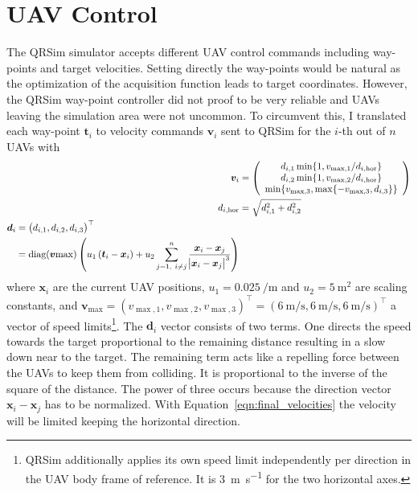 \documentclass[11pt,a4paper,twoside,BCOR=15mm]{scrreprt}
\newcommand{\vc}[1]{\bm{#1}}
\newcommand{\Tr}{^{\top}}
\DeclareMathOperator{\diag}{diag}
\begin{document}
\section{UAV Control}
The QRSim simulator accepts different UAV control commands including way-points 
and target velocities. Setting directly the way-points would be natural as the 
optimization of the acquisition function leads to target coordinates. However, 
the QRSim way-point controller did not proof to be very reliable and UAVs 
leaving the simulation area were not uncommon. To circumvent this, I translated 
each way-point $\vc t_i$ to velocity commands $\vc v_i$ sent to QRSim for the 
$i$-th out of $n$ UAVs with
\begin{align}
        \vc v_i &= \del{\begin{array}{c}
            d_{i, 1} \min\{1, v_{\max,1} / d_{i,\mathrm{hor}}\} \\
            d_{i, 2} \min\{1, v_{\max,2} / d_{i,\mathrm{hor}}\} \\
            \min\{v_{\max,3}, \max\{-v_{\max,3}, d_{i, 3}\}\}
        \end{array}} \label{eqn:final_velocities} \\
        d_{i,\mathrm{hor}} &= \sqrt{d_{i, 1}^2 + d_{i, 2}^2} \\
    \begin{split}
        \vc d_i &= \del{d_{i,1}, d_{i,2}, d_{i,3}}\Tr \\
        &= \diag(\vc v{\max}) \del{u_1 \del{\vc t_i - \vc x_i} + u_2 \sum_{j 
                = 1,\ i \neq j}^{n} \frac{\vc x_i - \vc x_j}{\abs{\vc x_i - \vc 
                    x_j}^3}}
    \end{split}
\end{align}
where $\vc x_i$ are the current UAV positions, $u_1 = \SI{0.025}{\per\meter}$ 
and $u_2 = \SI{5}{\meter\squared}$ are scaling constants, and $\vc v_{\max} 
= (v_{\max,1}, v_{\max,2}, v_{\max,3})\Tr = (\SI{6}{\meter\per\second}, 
\SI{6}{\meter\per\second}, \SI{6}{\meter\per\second})\Tr$ a vector of speed 
limits\footnote{QRSim additionally applies its own speed limit independently per 
    direction in the UAV body frame of reference. It is 
    \SI{3}{\meter\per\second} for the two horizontal axes.}.  The $\vc d_i$ 
vector consists of two terms.  One directs the speed towards the target 
proportional to the remaining distance resulting in a slow down near to the 
target. The remaining term acts like a repelling force between the UAVs to keep 
them from colliding.  It is proportional to the inverse of the square of the 
distance. The power of three occurs because the direction vector $\vc x_i - \vc 
x_j$ has to be normalized.  With Equation~\ref{eqn:final_velocities} the 
velocity will be limited keeping the horizontal direction.
\end{document}
